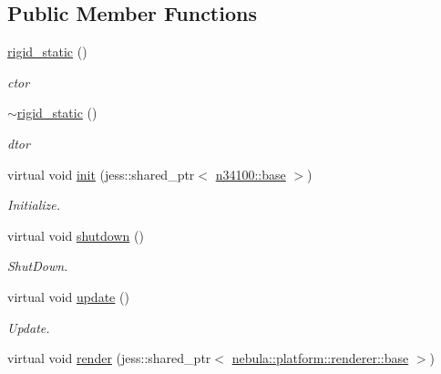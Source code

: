 \subsection*{Public Member Functions}
\begin{DoxyCompactItemize}
\item 
\hyperlink{classnebula_1_1content_1_1actor_1_1physics_1_1physx_1_1rigid__static_aab760c99217235c1a859436a9639a3ba}{rigid\_\-static} ()
\begin{DoxyCompactList}\small\item\em ctor \item\end{DoxyCompactList}\item 
\hyperlink{classnebula_1_1content_1_1actor_1_1physics_1_1physx_1_1rigid__static_ae09741dd8e7c2eff61b897983ddedf70}{$\sim$rigid\_\-static} ()
\begin{DoxyCompactList}\small\item\em dtor \item\end{DoxyCompactList}\item 
virtual void \hyperlink{classnebula_1_1content_1_1actor_1_1physics_1_1physx_1_1rigid__static_a4705b1b112a2acf67633658799d3f5fe}{init} (jess::shared\_\-ptr$<$ \hyperlink{classnebula_1_1content_1_1actor_1_1admin_1_1base}{n34100::base} $>$)
\begin{DoxyCompactList}\small\item\em Initialize. \item\end{DoxyCompactList}\item 
virtual void \hyperlink{classnebula_1_1content_1_1actor_1_1physics_1_1physx_1_1rigid__static_ae7253d0ce8bbafb563677f786d68bb2e}{shutdown} ()
\begin{DoxyCompactList}\small\item\em ShutDown. \item\end{DoxyCompactList}\item 
virtual void \hyperlink{classnebula_1_1content_1_1actor_1_1physics_1_1physx_1_1rigid__static_ada05e897e2f4dd915f525893fc027f39}{update} ()
\begin{DoxyCompactList}\small\item\em Update. \item\end{DoxyCompactList}\item 
virtual void \hyperlink{classnebula_1_1content_1_1actor_1_1physics_1_1physx_1_1rigid__static_adbbf849dd4601c92d5e292ae8158b769}{render} (jess::shared\_\-ptr$<$ \hyperlink{classnebula_1_1platform_1_1renderer_1_1base}{nebula::platform::renderer::base} $>$)

\end{DoxyCompactItemize}
